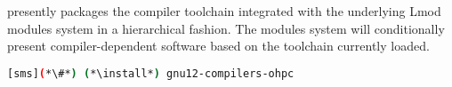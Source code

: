 \OHPC{} presently packages the \GNU{} compiler toolchain integrated with the 
underlying Lmod modules system in a hierarchical fashion. The modules
system will conditionally present compiler-dependent software based on the
toolchain currently loaded. 

\begin{lstlisting}[language=bash]
[sms](*\#*) (*\install*) gnu12-compilers-ohpc
\end{lstlisting}

